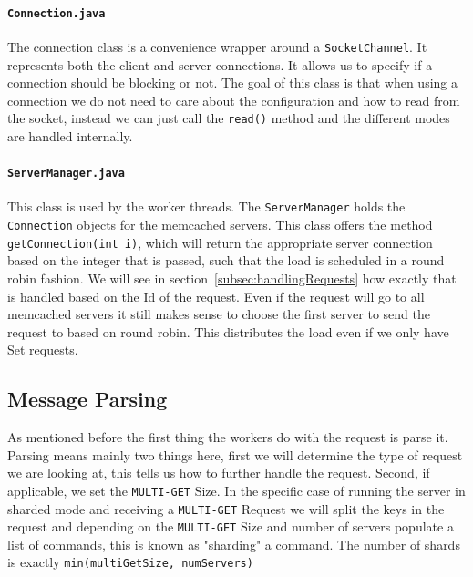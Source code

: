 \documentclass[11pt,a4paper]{article}
\begin{document}
\paragraph{\texttt{Connection.java}}
%
The connection class is a convenience wrapper around a \texttt{SocketChannel}.
%
It represents both the client and server connections.
%
It allows us to specify if a connection should be blocking or not.
%
The goal of this class is that when using a connection we do not need to care about the configuration and how to read from the socket, instead we can just call the \texttt{read()} method and the different modes are handled internally.
%
\paragraph{\texttt{ServerManager.java}}
%
This class is used by the worker threads.
%
The \texttt{ServerManager} holds the \texttt{Connection} objects for the memcached servers.
%
This class offers the method \texttt{getConnection(int i)}, which will return the appropriate server connection based on the integer that is passed, such that the load is scheduled in a round robin fashion.
%
We will see in section~\ref{subsec:handlingRequests} how exactly that is handled based on the Id of the request.
%
Even if the request will go to all memcached servers it still makes sense to choose the first server to send the request to based on round robin.
%
This distributes the load even if we only have Set requests.
%
\subsection{Message Parsing}
%
As mentioned before the first thing the workers do with the request is parse it.
%
Parsing means mainly two things here, first we will determine the type of request we are looking at, this tells us how to further handle the request.
%
Second, if applicable, we set the \texttt{MULTI-GET} Size.
%
In the specific case of running the server in sharded mode and receiving a \texttt{MULTI-GET} Request we will split the keys in the request and depending on the \texttt{MULTI-GET} Size and number of servers populate a list of commands, this is known as "sharding" a command.
%
The number of shards is exactly \texttt{min(multiGetSize, numServers)}
%
\end{document}

